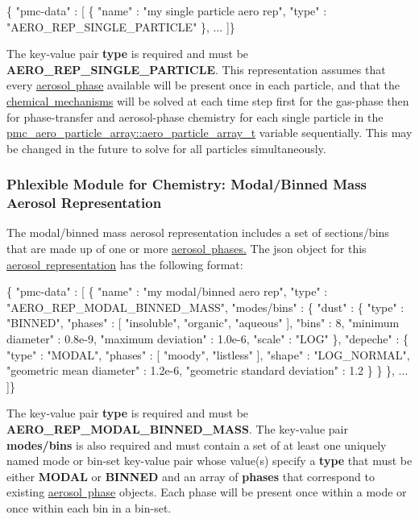 \begin{DoxyCode}
\{ "pmc-data" : [
  \{
    "name" : "my single particle aero rep",
    "type" : "AERO\_REP\_SINGLE\_PARTICLE"
  \},
  ...
]\}
\end{DoxyCode}
 The key-\/value pair {\bfseries type} is required and must be {\bfseries A\+E\+R\+O\+\_\+\+R\+E\+P\+\_\+\+S\+I\+N\+G\+L\+E\+\_\+\+P\+A\+R\+T\+I\+C\+LE}. This representation assumes that every \mbox{\hyperlink{input_format_aero_phase}{aerosol phase}} available will be present once in each particle, and that the \mbox{\hyperlink{input_format_mechanism}{chemical mechanisms}} will be solved at each time step first for the gas-\/phase then for phase-\/transfer and aerosol-\/phase chemistry for each single particle in the {\ttfamily \mbox{\hyperlink{structpmc__aero__particle__array_1_1aero__particle__array__t}{pmc\+\_\+aero\+\_\+particle\+\_\+array\+::aero\+\_\+particle\+\_\+array\+\_\+t}}} variable sequentially. This may be changed in the future to solve for all particles simultaneously. \hypertarget{phlex_aero_rep_modal_binned_mass}{}\subsubsection{Phlexible Module for Chemistry\+: Modal/\+Binned Mass Aerosol Representation}\label{phlex_aero_rep_modal_binned_mass}
The modal/binned mass aerosol representation includes a set of sections/bins that are made up of one or more \mbox{\hyperlink{phlex_aero_phase}{aerosol phases.}} The {\ttfamily json} object for this \mbox{\hyperlink{phlex_aero_rep}{aerosol representation}} has the following format\+:


\begin{DoxyCode}
\{ "pmc-data" : [
  \{
    "name" : "my modal/binned aero rep",
    "type" : "AERO\_REP\_MODAL\_BINNED\_MASS",
    "modes/bins" : 
    \{
      "dust" : 
      \{
        "type" : "BINNED",
        "phases" : [ "insoluble", "organic", "aqueous" ],
        "bins" : 8,
        "minimum diameter" : 0.8e-9,
        "maximum deviation" : 1.0e-6,
        "scale" : "LOG"
      \},
      "depeche" :
      \{
        "type" : "MODAL",
        "phases" : [ "moody", "listless" ],
        "shape" : "LOG\_NORMAL",
        "geometric mean diameter" : 1.2e-6,
        "geometric standard deviation" : 1.2
      \}
    \}
  \},
  ...
]\}
\end{DoxyCode}
 The key-\/value pair {\bfseries type} is required and must be {\bfseries A\+E\+R\+O\+\_\+\+R\+E\+P\+\_\+\+M\+O\+D\+A\+L\+\_\+\+B\+I\+N\+N\+E\+D\+\_\+\+M\+A\+SS}. The key-\/value pair {\bfseries modes/bins} is also required and must contain a set of at least one uniquely named mode or bin-\/set key-\/value pair whose value(s) specify a {\bfseries type} that must be either {\bfseries M\+O\+D\+AL} or {\bfseries B\+I\+N\+N\+ED} and an array of {\bfseries phases} that correspond to existing \mbox{\hyperlink{phlex_aero_phase}{aerosol phase}} objects. Each phase will be present once within a mode or once within each bin in a bin-\/set.

